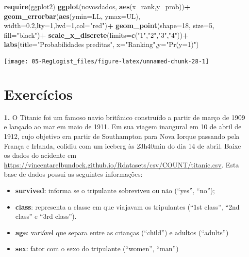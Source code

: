 \documentclass[12pt,brazil,oneside]{book}
\newenvironment{Shaded}{\begin{snugshade}}{\end{snugshade}}
\newcommand{\DataTypeTok}[1]{\textcolor[rgb]{0.13,0.29,0.53}{#1}}
\newcommand{\DecValTok}[1]{\textcolor[rgb]{0.00,0.00,0.81}{#1}}
\newcommand{\FloatTok}[1]{\textcolor[rgb]{0.00,0.00,0.81}{#1}}
\newcommand{\KeywordTok}[1]{\textcolor[rgb]{0.13,0.29,0.53}{\textbf{#1}}}
\newcommand{\NormalTok}[1]{#1}
\newcommand{\OperatorTok}[1]{\textcolor[rgb]{0.81,0.36,0.00}{\textbf{#1}}}
\newcommand{\StringTok}[1]{\textcolor[rgb]{0.31,0.60,0.02}{#1}}
\providecommand{\tightlist}{%
  \setlength{\itemsep}{0pt}\setlength{\parskip}{0pt}}
\begin{document}
\begin{Shaded}
\begin{Highlighting}[]
\KeywordTok{require}\NormalTok{(ggplot2)}
\KeywordTok{ggplot}\NormalTok{(novosdados, }\KeywordTok{aes}\NormalTok{(}\DataTypeTok{x=}\NormalTok{rank,}\DataTypeTok{y=}\NormalTok{prob))}\OperatorTok{+}
\StringTok{  }\KeywordTok{geom_errorbar}\NormalTok{(}\KeywordTok{aes}\NormalTok{(}\DataTypeTok{ymin=}\NormalTok{LL, }\DataTypeTok{ymax=}\NormalTok{UL), }\DataTypeTok{width=}\FloatTok{0.2}\NormalTok{,}\DataTypeTok{lty=}\DecValTok{1}\NormalTok{,}\DataTypeTok{lwd=}\DecValTok{1}\NormalTok{,}\DataTypeTok{col=}\StringTok{"red"}\NormalTok{)}\OperatorTok{+}
\StringTok{  }\KeywordTok{geom_point}\NormalTok{(}\DataTypeTok{shape=}\DecValTok{18}\NormalTok{, }\DataTypeTok{size=}\DecValTok{5}\NormalTok{, }\DataTypeTok{fill=}\StringTok{"black"}\NormalTok{)}\OperatorTok{+}
\StringTok{  }\KeywordTok{scale_x_discrete}\NormalTok{(}\DataTypeTok{limits=}\KeywordTok{c}\NormalTok{(}\StringTok{"1"}\NormalTok{,}\StringTok{"2"}\NormalTok{,}\StringTok{"3"}\NormalTok{,}\StringTok{"4"}\NormalTok{))}\OperatorTok{+}
\StringTok{  }\KeywordTok{labs}\NormalTok{(}\DataTypeTok{title=}\StringTok{"Probabilidades preditas"}\NormalTok{, }\DataTypeTok{x=}\StringTok{"Ranking"}\NormalTok{,}\DataTypeTok{y=}\StringTok{"Pr(y=1)"}\NormalTok{)}
\end{Highlighting}
\end{Shaded}

\begin{center}\texttt{[image: 05-RegLogist\_files/figure-latex/unnamed-chunk-28-1]} \end{center}

\hypertarget{exercicios}{%
\section{Exercícios}\label{exercicios}}

\textbf{1.} O Titanic foi um famoso navio britânico construído a partir
de março de 1909 e lançado ao mar em maio de 1911. Em sua viagem
inaugural em 10 de abril de 1912, cujo objetivo era partir de
Southampton para Nova Iorque passando pela França e Irlanda, colidiu com
um iceberg às 23h40min do dia 14 de abril. Baixe os dados do acidente em
\url{https://vincentarelbundock.github.io/Rdatasets/csv/COUNT/titanic.csv}.
Esta base de dados possui as seguintes informações:

\begin{itemize}
\tightlist
\item
  \textbf{survived}: informa se o tripulante sobreviveu ou não (``yes'',
  ``no'');
\item
  \textbf{class}: representa a classe em que viajavam os tripulantes
  (``1st class'', ``2nd class'' e ``3rd class'').
\item
  \textbf{age}: variável que separa entre as crianças (``child'') e
  adultos (``adults'')
\item
  \textbf{sex}: fator com o sexo do tripulante (``women'', ``man'')
\end{itemize}
\end{document}
